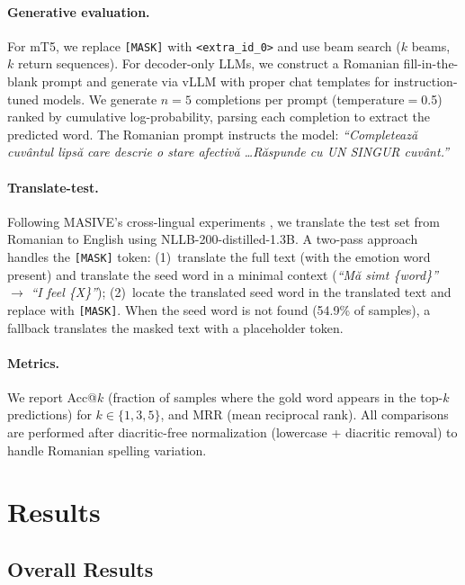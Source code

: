 \documentclass[11pt]{article}
\begin{document}
\paragraph{Generative evaluation.} For mT5, we replace \texttt{[MASK]} with \texttt{<extra\_id\_0>} and use beam search ($k$ beams, $k$ return sequences). For decoder-only LLMs, we construct a Romanian fill-in-the-blank prompt and generate via vLLM \cite{vllm2023} with proper chat templates for instruction-tuned models. We generate $n{=}5$ completions per prompt (temperature$=$0.5) ranked by cumulative log-probability, parsing each completion to extract the predicted word. The Romanian prompt instructs the model: \textit{``Completeaz\u{a} cuv\^{a}ntul lips\u{a} care descrie o stare afectiv\u{a} \ldots R\u{a}spunde cu UN SINGUR cuv\^{a}nt.''}

\paragraph{Translate-test.} Following MASIVE's cross-lingual experiments \cite{masive2024}, we translate the test set from Romanian to English using NLLB-200-distilled-1.3B. A two-pass approach handles the \texttt{[MASK]} token: (1)~translate the full text (with the emotion word present) and translate the seed word in a minimal context (\textit{``M\u{a} simt \{word\}''} $\rightarrow$ \textit{``I feel \{X\}''}); (2)~locate the translated seed word in the translated text and replace with \texttt{[MASK]}. When the seed word is not found (54.9\% of samples), a fallback translates the masked text with a placeholder token.

\paragraph{Metrics.} We report Acc@$k$ (fraction of samples where the gold word appears in the top-$k$ predictions) for $k \in \{1, 3, 5\}$, and MRR (mean reciprocal rank). All comparisons are performed after diacritic-free normalization (lowercase + diacritic removal) to handle Romanian spelling variation.


\section{Results}

\subsection{Overall Results}
\end{document}
